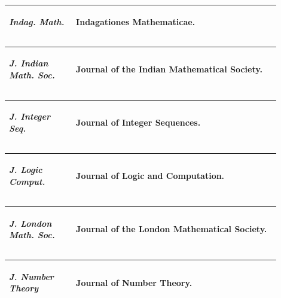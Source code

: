 \documentclass[11pt,reqno]{amsart}
\theoremstyle{blueplain}
\numberwithin{equation}{section}
\def\hyperlink#1#2{#2}}
\begin{document}
\par\setlength{\parskip}{0pt}\nointerlineskip
\noindent
\begin{tabular}{|@{}p{0.22500\linewidth}|p{0.67500\linewidth}|}\hline
\hypertarget{abbr:journal-Indag-Math}{}\hyperlink{abbr-source:Kuipers1950}{\emph{Indag. Math.}} & Indagationes Mathematicae.\\\hline
\end{tabular}%
\par\setlength{\parskip}{0pt}\nointerlineskip
\noindent
\begin{tabular}{|@{}p{0.22500\linewidth}|p{0.67500\linewidth}|}\hline
\hypertarget{abbr:journal-J-Indian-Math-Soc}{}\hyperlink{abbr-source:Srinivasan1961}{\emph{J. Indian Math. Soc.}} & Journal of the Indian Mathematical Society.\\\hline
\end{tabular}%
\par\setlength{\parskip}{0pt}\nointerlineskip
\noindent
\begin{tabular}{|@{}p{0.22500\linewidth}|p{0.67500\linewidth}|}\hline
\hypertarget{abbr:journal-J-Integer-Seq}{}\hyperlink{abbr-source:CaldwellCheng2005}{\emph{J. Integer Seq.}} & Journal of Integer Sequences.\\\hline
\end{tabular}%
\par\setlength{\parskip}{0pt}\nointerlineskip
\noindent
\begin{tabular}{|@{}p{0.22500\linewidth}|p{0.67500\linewidth}|}\hline
\hypertarget{abbr:journal-J-Logic-Comput}{}\hyperlink{abbr-source:Leivant2021}{\emph{J. Logic Comput.}} & Journal of Logic and Computation.\\\hline
\end{tabular}%
\par\setlength{\parskip}{0pt}\nointerlineskip
\noindent
\begin{tabular}{|@{}p{0.22500\linewidth}|p{0.67500\linewidth}|}\hline
\hypertarget{abbr:journal-J-London-Math-Soc}{}\hyperlink{abbr-source:Wright1954}{\emph{J. London Math. Soc.}} & Journal of the London Mathematical Society.\\\hline
\end{tabular}%
\par\setlength{\parskip}{0pt}\nointerlineskip
\noindent
\begin{tabular}{|@{}p{0.22500\linewidth}|p{0.67500\linewidth}|}\hline
\hypertarget{abbr:journal-J-Number-Theory}{}\hyperlink{abbr-source:CullyHugill2023}{\emph{J. Number Theory}} & Journal of Number Theory.\\\hline
\end{tabular}%
\end{document}

